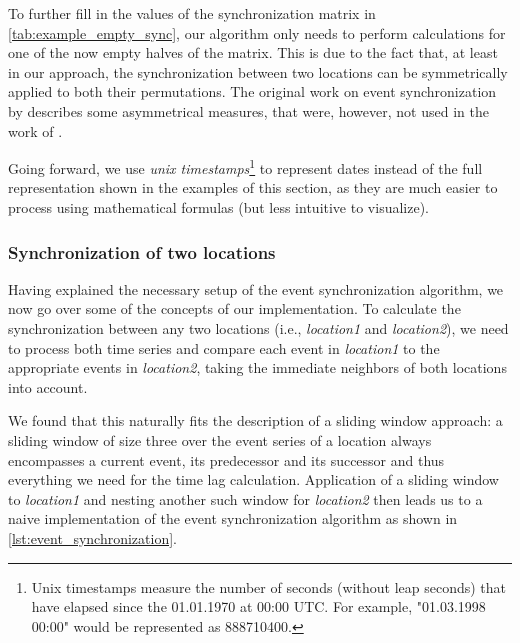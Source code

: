 To further fill in the values of the synchronization matrix in \cref{tab:example_empty_sync}, our algorithm only needs to perform calculations for one of the now empty halves of the matrix. This is due to the fact that, at least in our approach, the synchronization between two locations can be symmetrically applied to both their permutations. The original work on event synchronization by \citet{QuianQuiroga.2002} describes some asymmetrical measures, that were, however, not used in the work of \citet{Stolbova.2015}.

Going forward, we use \textit{unix timestamps}\footnote{Unix timestamps measure the number of seconds (without leap seconds) that have elapsed since the 01.01.1970 at 00:00 UTC. For example, "01.03.1998 00:00" would be represented as 888710400.} to represent dates instead of the full representation shown in the examples of this section, as they are much easier to process using mathematical formulas (but less intuitive to visualize).

\pagebreak
\subsubsection{Synchronization of two locations}
Having explained the necessary setup of the event synchronization algorithm, we now go over some of the concepts of our implementation. To calculate the synchronization between any two locations (i.e., \textit{location1} and \textit{location2}), we need to process both time series and compare each event in \textit{location1} to the appropriate events in \textit{location2}, taking the immediate neighbors of both locations into account.

We found that this naturally fits the description of a sliding window approach: a sliding window of size three over the event series of a location always encompasses a current event, its predecessor and its successor and thus everything we need for the time lag calculation. Application of a sliding window to \textit{location1} and nesting another such window for \textit{location2} then leads us to a naive implementation of the event synchronization algorithm as shown in \cref{lst:event_synchronization}.

